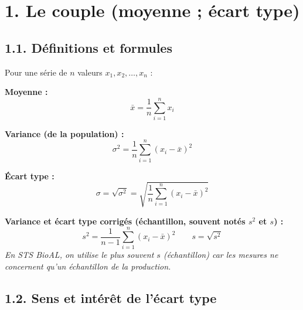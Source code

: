 \documentclass[11pt,a4paper]{article}
\begin{document}
\vspace{0.4cm}

\section*{1. Le couple (moyenne ; écart type)}

\subsection*{1.1. Définitions et formules}

\begin{rappel}
Pour une série de $n$ valeurs $x_1, x_2, \dots, x_n$ :

\vspace{0.2cm}
\textbf{Moyenne :}
\[
\bar{x} = \frac{1}{n}\sum_{i=1}^{n} x_i
\]

\vspace{0.2cm}
\textbf{Variance (de la population) :}
\[
\sigma^2 = \frac{1}{n}\sum_{i=1}^{n} (x_i - \bar{x})^2
\]

\vspace{0.2cm}
\textbf{Écart type :}
\[
\sigma = \sqrt{\sigma^2} = \sqrt{\frac{1}{n}\sum_{i=1}^{n} (x_i - \bar{x})^2}
\]

\vspace{0.2cm}
\textbf{Variance et écart type corrigés (échantillon, souvent notés $s^2$ et $s$) :}
\[
s^2 = \frac{1}{n-1}\sum_{i=1}^{n} (x_i - \bar{x})^2
\qquad
s = \sqrt{s^2}
\]
\textit{En STS BioAL, on utilise le plus souvent $s$ (échantillon) car les mesures ne concernent qu'un échantillon de la production.}
\end{rappel}

\subsection*{1.2. Sens et intérêt de l'écart type}
\end{document}
